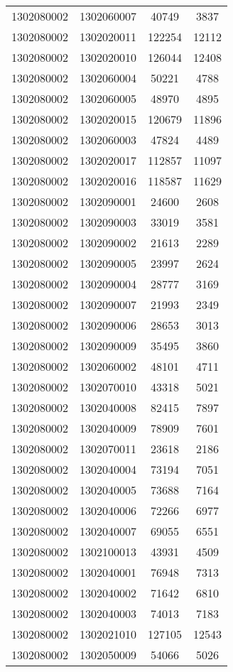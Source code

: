 \begin{longtable}{llcc}
1302080002 & 1302060007 & 40749 & 3837\\
1302080002 & 1302020011 & 122254 & 12112\\
1302080002 & 1302020010 & 126044 & 12408\\
1302080002 & 1302060004 & 50221 & 4788\\
1302080002 & 1302060005 & 48970 & 4895\\
1302080002 & 1302020015 & 120679 & 11896\\
1302080002 & 1302060003 & 47824 & 4489\\
1302080002 & 1302020017 & 112857 & 11097\\
1302080002 & 1302020016 & 118587 & 11629\\
1302080002 & 1302090001 & 24600 & 2608\\
1302080002 & 1302090003 & 33019 & 3581\\
1302080002 & 1302090002 & 21613 & 2289\\
1302080002 & 1302090005 & 23997 & 2624\\
1302080002 & 1302090004 & 28777 & 3169\\
1302080002 & 1302090007 & 21993 & 2349\\
1302080002 & 1302090006 & 28653 & 3013\\
1302080002 & 1302090009 & 35495 & 3860\\
1302080002 & 1302060002 & 48101 & 4711\\
1302080002 & 1302070010 & 43318 & 5021\\
1302080002 & 1302040008 & 82415 & 7897\\
1302080002 & 1302040009 & 78909 & 7601\\
1302080002 & 1302070011 & 23618 & 2186\\
1302080002 & 1302040004 & 73194 & 7051\\
1302080002 & 1302040005 & 73688 & 7164\\
1302080002 & 1302040006 & 72266 & 6977\\
1302080002 & 1302040007 & 69055 & 6551\\
1302080002 & 1302100013 & 43931 & 4509\\
1302080002 & 1302040001 & 76948 & 7313\\
1302080002 & 1302040002 & 71642 & 6810\\
1302080002 & 1302040003 & 74013 & 7183\\
1302080002 & 1302021010 & 127105 & 12543\\
1302080002 & 1302050009 & 54066 & 5026\\

\end{longtable}

